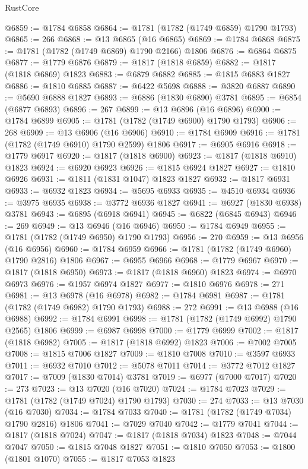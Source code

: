 \begin{lexlean}{RustCore}
\begin{coremodule}
@6859 := @1784 @6858
@6864 := @1781 (@1782 (@1749 @6859) @1790 @1793)
@6865 := 266
@6868 := @13 @6865 (@16 @6865)
@6869 := @1784 @6868
@6875 := @1781 (@1782 (@1749 @6869) @1790 @2166) @1806
@6876 := @6864 @6875
@6877 := @1779 @6876
@6879 := @1817 (@1818 @6859)
@6882 := @1817 (@1818 @6869) @1823
@6883 := @6879 @6882
@6885 := @1815 @6883 @1827
@6886 := @1810 @6885
@6887 := @6422 @5698
@6888 := @3820 @6887
@6890 := @5690 @6888 @1827
@6893 := @6886 (@1830 @6890) @3781
@6895 := @6854 (@6877 @6893)
@6896 := 267
@6899 := @13 @6896 (@16 @6896)
@6900 := @1784 @6899
@6905 := @1781 (@1782 (@1749 @6900) @1790 @1793)
@6906 := 268
@6909 := @13 @6906 (@16 @6906)
@6910 := @1784 @6909
@6916 := @1781 (@1782 (@1749 @6910) @1790 @2599) @1806
@6917 := @6905 @6916
@6918 := @1779 @6917
@6920 := @1817 (@1818 @6900)
@6923 := @1817 (@1818 @6910) @1823
@6924 := @6920 @6923
@6926 := @1815 @6924 @1827
@6927 := @1810 @6926
@6931 := @1811 (@1831 @1047) @1823 @1827
@6932 := @1817 @6931
@6933 := @6932 @1823
@6934 := @5695 @6933
@6935 := @4510 @6934
@6936 := @3975 @6935
@6938 := @3772 @6936 @1827
@6941 := @6927 (@1830 @6938) @3781
@6943 := @6895 (@6918 @6941)
@6945 := @6822 (@6845 @6943)
@6946 := 269
@6949 := @13 @6946 (@16 @6946)
@6950 := @1784 @6949
@6955 := @1781 (@1782 (@1749 @6950) @1790 @1793)
@6956 := 270
@6959 := @13 @6956 (@16 @6956)
@6960 := @1784 @6959
@6966 := @1781 (@1782 (@1749 @6960) @1790 @2816) @1806
@6967 := @6955 @6966
@6968 := @1779 @6967
@6970 := @1817 (@1818 @6950)
@6973 := @1817 (@1818 @6960) @1823
@6974 := @6970 @6973
@6976 := @1957 @6974 @1827
@6977 := @1810 @6976
@6978 := 271
@6981 := @13 @6978 (@16 @6978)
@6982 := @1784 @6981
@6987 := @1781 (@1782 (@1749 @6982) @1790 @1793)
@6988 := 272
@6991 := @13 @6988 (@16 @6988)
@6992 := @1784 @6991
@6998 := @1781 (@1782 (@1749 @6992) @1790 @2565) @1806
@6999 := @6987 @6998
@7000 := @1779 @6999
@7002 := @1817 (@1818 @6982)
@7005 := @1817 (@1818 @6992) @1823
@7006 := @7002 @7005
@7008 := @1815 @7006 @1827
@7009 := @1810 @7008
@7010 := @3597 @6933
@7011 := @6932 @7010
@7012 := @5078 @7011
@7014 := @3772 @7012 @1827
@7017 := @7009 (@1830 @7014) @3781
@7019 := @6977 (@7000 @7017)
@7020 := 273
@7023 := @13 @7020 (@16 @7020)
@7024 := @1784 @7023
@7029 := @1781 (@1782 (@1749 @7024) @1790 @1793)
@7030 := 274
@7033 := @13 @7030 (@16 @7030)
@7034 := @1784 @7033
@7040 := @1781 (@1782 (@1749 @7034) @1790 @2816) @1806
@7041 := @7029 @7040
@7042 := @1779 @7041
@7044 := @1817 (@1818 @7024)
@7047 := @1817 (@1818 @7034) @1823
@7048 := @7044 @7047
@7050 := @1815 @7048 @1827
@7051 := @1810 @7050
@7053 := @1800 (@1801 @1070)
@7055 := @1817 @7053 @1823

\end{coremodule}
\end{lexlean}
